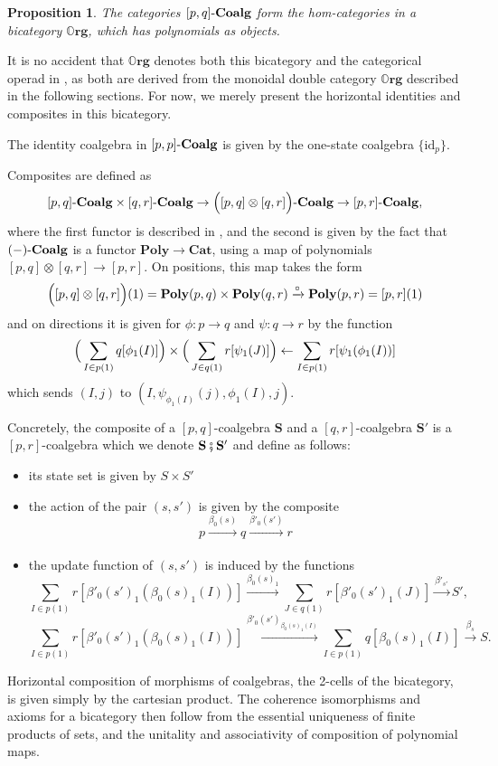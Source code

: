 \documentclass[11pt, one side, article]{memoir}
\theoremstyle{definition}
\theoremstyle{plain}
\newtheorem{proposition}[definitionx]{Proposition}
\newcommand{\Cat}[1]{\mathbf{#1}}%
\newcommand{\id}{\mathrm{id}}
\newcommand{\then}{\mathbin{\fatsemi}}
\newcommand{\To}[2][]{\xrightarrow[#1]{#2}}
\newcommand{\from}{\leftarrow}
\newcommand{\tn}[1]{\textnormal{#1}}
\newcommand{\smcat}{\Cat{Cat}}
\newcommand{\poly}{\Cat{Poly}}
\newcommand{\0}{\textsf{0}}
\newcommand{\1}{\tn{\textsf{1}}}
\newcommand{\coalg}{\tn{-}\Cat{Coalg}}
\newcommand{\org}{{\mathbb{O}\Cat{rg}}}
\renewcommand{\S}{{\Cat{S}}}
\newcommand{\blp}{\Big{(}}
\newcommand{\brp}{\Big{)}}
\newcommand{\idcoalg}[1]{{\{\id_{#1}\}}}
\begin{document}
\begin{proposition}
The categories $[p,q]\coalg$ form the hom-categories in a bicategory $\org$, which has polynomials as objects.
\end{proposition}

It is no accident that $\org$ denotes both this bicategory and the categorical operad in \cite[Definition 2.19]{spivak2021learners}, as both are derived from the monoidal double category $\org$ described in the following sections. For now, we merely present the horizontal identities and composites in this bicategory.

The identity coalgebra in $[p,p]\coalg$ is given by the one-state coalgebra $\idcoalg{p}$. 

Composites are defined as
$$[p,q]\coalg \times [q,r]\coalg \to \blp[p,q] \otimes [q,r]\brp\coalg \to [p,r]\coalg,$$
where the first functor is described in \cite[Proposition 2.13]{spivak2021learners}, and the second is given by the fact that $(-)\coalg$ is a functor $\poly \to \smcat$, using a map of polynomials $[p,q] \otimes [q,r] \to [p,r]$. On positions, this map takes the form
$$\blp[p,q] \otimes [q,r]\brp(1) = \poly(p,q) \times \poly(q,r) \To{\circ} \poly(p,r) = [p,r](1)$$
and on directions it is given for $\phi : p \to q$ and $\psi : q \to r$ by the function
$$\blp\sum_{I \in p(1)} q[\phi_1(I)]\brp \times \blp\sum_{J \in q(1)} r[\psi_1(J)]\brp \from \sum_{I \in p(1)} r[\psi_1(\phi_1(I))]$$
which sends $(I,j)$ to $(I,\psi_{\phi_1(I)}(j),\phi_1(I),j)$. 

Concretely, the composite of a $[p,q]$-coalgebra $\S$ and a $[q,r]$-coalgebra $\S'$ is a $[p,r]$-coalgebra which we denote $\S\then\S'$  and define as follows:
\begin{itemize}
	\item its state set is given by $S \times S'$
	\item the action of the pair $(s,s')$ is given by the composite 
$$p \To{\beta_0(s)} q \To{\beta'_0(s')} r$$
	\item the update function of $(s,s')$ is induced by the functions
$$\sum_{I \in p(1)} r[\beta'_0(s')_1(\beta_0(s)_1(I))] \To{\beta_0(s)_1} \sum_{J \in q(1)} r[\beta'_0(s')_1(J)] \To{\beta'_{s'}} S',$$
$$\sum_{I \in p(1)} r[\beta'_0(s')_1(\beta_0(s)_1(I))] \To{\beta'_0(s')_{\beta_0(s)_1(I)}} \sum_{I \in p(1)} q[\beta_0(s)_1(I)] \To{\beta_s} S.$$%
\end{itemize}
Horizontal composition of morphisms of coalgebras, the 2-cells of the bicategory, is given simply by the cartesian product. The coherence isomorphisms and axioms for a bicategory then follow from the essential uniqueness of finite products of sets, and the unitality and associativity of composition of polynomial maps.%
\end{document}

